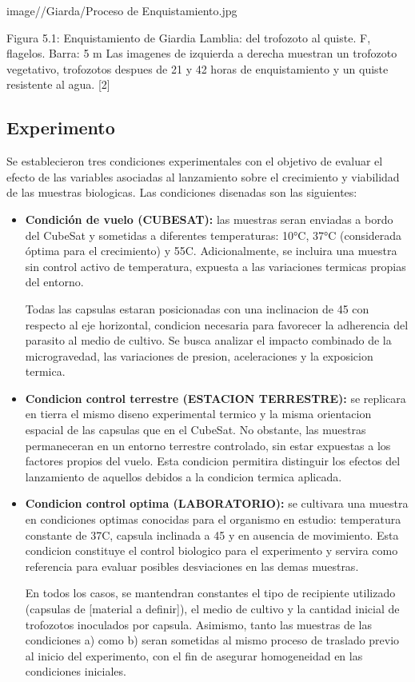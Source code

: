     image//Giarda/Proceso de Enquistamiento.jpg

    Figura 5.1: Enquistamiento de Giardia Lamblia: del trofozoto al quiste. F, flagelos. Barra: 5
    m
    Las imagenes de izquierda a derecha muestran un trofozoto vegetativo, trofozotos despues de 21 y
    42 horas de enquistamiento y un quiste resistente al agua. [2]

  \subsection{Experimento}
    Se establecieron tres condiciones experimentales con el objetivo de evaluar el efecto de las
    variables asociadas al lanzamiento sobre el crecimiento y viabilidad de las muestras biologicas.
    Las condiciones disenadas son las siguientes:
 
    \begin{itemize}
      \item \textbf{Condición de vuelo (CUBESAT):} las muestras seran enviadas a bordo del CubeSat y
      sometidas a diferentes temperaturas: 10°C, 37°C (considerada óptima para el
      crecimiento) y 55C. Adicionalmente, se incluira una muestra sin control activo de temperatura,
      expuesta a las variaciones termicas propias del entorno.

      Todas las capsulas estaran posicionadas con una inclinacion de 45 con respecto al eje horizontal, condicion
      necesaria para favorecer la adherencia del parasito al medio de cultivo. Se busca analizar el
      impacto combinado de la microgravedad, las variaciones de presion, aceleraciones
      y la exposicion termica.

      \item \textbf{Condicion control terrestre (ESTACION TERRESTRE):} se replicara en tierra
      el mismo diseno experimental termico y la misma orientacion espacial de las capsulas
      que en el CubeSat. No obstante, las muestras permaneceran en un entorno terrestre
      controlado, sin estar expuestas a los factores propios del vuelo. Esta condicion permitira
      distinguir los efectos del lanzamiento de aquellos debidos a la condicion termica
      aplicada.

      \item \textbf{Condicion control optima (LABORATORIO):} se cultivara una muestra en condiciones optimas
      conocidas para el organismo en estudio: temperatura constante de
      37C, capsula inclinada a 45 y en ausencia de movimiento. Esta condicion constituye
      el control biologico para el experimento y servira como referencia para evaluar posibles
      desviaciones en las demas muestras.

      En todos los casos, se mantendran constantes el tipo de recipiente utilizado (capsulas de
      [material a definir]), el medio de cultivo y la cantidad inicial de trofozotos inoculados por
      capsula. Asimismo, tanto las muestras de las condiciones a) como b) seran sometidas al mismo
      proceso de traslado previo al inicio del experimento, con el fin de asegurar homogeneidad en
      las condiciones iniciales.
    \end{itemize}

